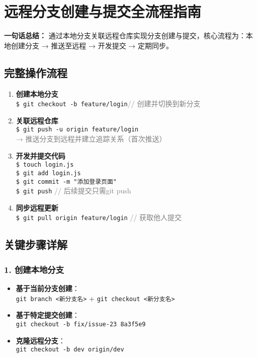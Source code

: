 \section{远程分支创建与提交全流程指南}
\textbf{一句话总结：}  
通过本地分支关联远程仓库实现分支创建与提交，核心流程为：本地创建分支 → 推送至远程 → 开发提交 → 定期同步。

\subsection{完整操作流程}
\begin{enumerate}[leftmargin=*, nosep]
    \item \textbf{创建本地分支} \\
    {\color{red}\texttt{\$ git checkout -b feature/login}}\quad \textcolor{gray}{// 创建并切换到新分支}
    
    \item \textbf{关联远程仓库} \\
   {\color{red} \texttt{\$ git push -u origin feature/login} }\\
    \textcolor{gray}{→ 推送分支到远程并建立追踪关系（首次推送）}
    
    \item \textbf{开发并提交代码} \\
    \texttt{\$ touch login.js} \\
    {\color{red} \texttt{\$ git add login.js} }\\
    {\color{red} \texttt{\$ git commit -m "添加登录页面"} }\\
    {\color{red} \texttt{\$ git push} \quad \textcolor{gray}{// 后续提交只需git push}}
    
    \item \textbf{同步远程更新} \\
    \texttt{\$ git pull origin feature/login} \quad \textcolor{gray}{// 获取他人提交}
\end{enumerate}

\subsection{关键步骤详解}
\subsubsection{1. 创建本地分支}
\begin{itemize}[leftmargin=*, nosep]
    \item \textbf{基于当前分支创建}：\\
    \texttt{git branch <新分支名>} + \texttt{git checkout <新分支名>}
    
    \item \textbf{基于特定提交创建}：\\
    \texttt{git checkout -b fix/issue-23 8a3f5e9}
    
    \item \textbf{克隆远程分支}：\\
    \texttt{git checkout -b dev origin/dev}
\end{itemize}

